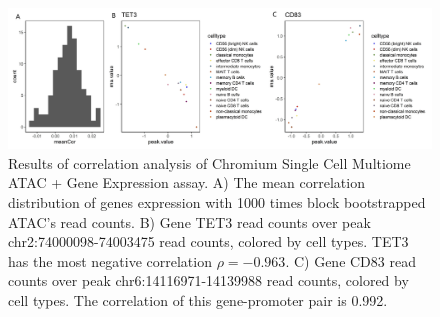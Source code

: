 \documentclass{article}
\begin{document}
\begin{figure}[htbp]
\centering
\includegraphics[scale=0.08]{Figures/sfig2.jpeg}
\caption{Results of correlation analysis of Chromium Single Cell Multiome ATAC + Gene Expression assay. A) The mean correlation distribution of genes expression with 1000 times block bootstrapped ATAC's read counts. B) Gene TET3 read counts over peak chr2:74000098-74003475 read counts, colored by cell types. TET3 has the most negative correlation $\rho = −0.963$. C) Gene CD83 read counts over peak chr6:14116971-14139988 read counts, colored by cell types. The correlation of this gene-promoter pair is 0.992.} 
\label{fig:suppfig3}
\end{figure}


%
%
%
%
%
%
%

\end{document}
